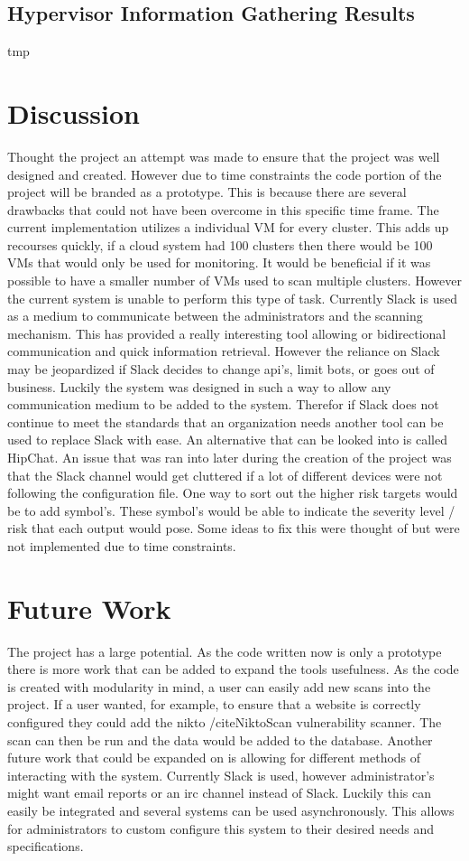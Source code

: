 \documentclass[12pt]{article}
\begin{document}
\subsection{Hypervisor Information Gathering Results}
tmp


\section{Discussion}
Thought the project an attempt was made to ensure that the project was well designed and created. However due to time constraints the code portion of the project will be branded as a prototype. This is because there are several drawbacks that could not have been overcome in this specific time frame. The current implementation utilizes a individual VM for every cluster. This adds up recourses quickly, if a cloud system had 100 clusters then there would be 100 VMs that would only be used for monitoring. It would be beneficial if it was possible to have a smaller number of VMs used to scan multiple clusters. However the current system is unable to perform this type of task. Currently Slack is used as a medium to communicate between the administrators and the scanning mechanism. This has provided a really interesting tool allowing or bidirectional communication and quick information retrieval. However the reliance on Slack may be jeopardized if Slack decides to change api's, limit bots, or goes out of business. Luckily the system was designed in such a way to allow any communication medium to be added to the system. Therefor if Slack does not continue to meet the standards that an organization needs another tool can be used to replace Slack with ease. An alternative that can be looked into is called HipChat.  An issue that was ran into later during the creation of the project was that the Slack channel would get cluttered if a lot of different devices were not following the configuration file. One way to sort out the higher risk targets would be to add symbol's. These symbol's would be able to indicate the severity level / risk that each output would pose. Some ideas to fix this were thought of but were not implemented due to time constraints.

\section{Future Work}
The project has a large potential. As the code written now is only a prototype there is more work that can be added to expand the tools usefulness. As the code is created with modularity in mind, a user can easily add new scans into the project. If a user wanted, for example, to ensure that a website is correctly configured they could add the nikto /cite{NiktoScan} vulnerability scanner. The scan can then be run and the data would be added to the database. Another future work that could be expanded on is allowing for different methods of interacting with the system. Currently Slack is used, however administrator's might want email reports or an irc channel instead of Slack. Luckily this can easily be integrated and several systems can be used asynchronously. This allows for administrators to custom configure this system to their desired needs and specifications.
\end{document}
